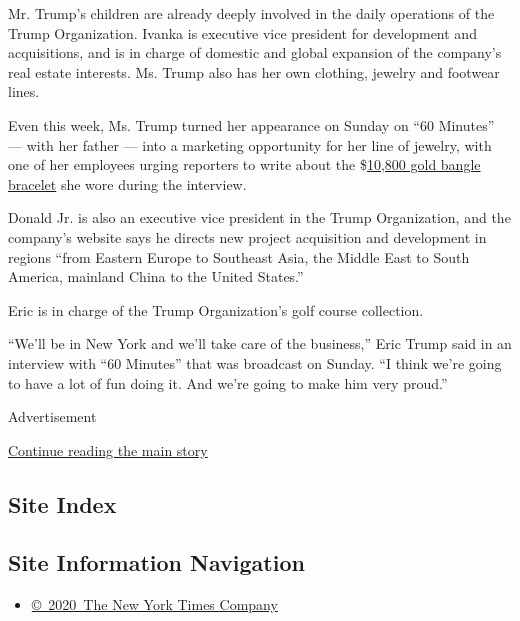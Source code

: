 Mr. Trump's children are already deeply involved in the daily operations
of the Trump Organization. Ivanka is executive vice president for
development and acquisitions, and is in charge of domestic and global
expansion of the company's real estate interests. Ms. Trump also has her
own clothing, jewelry and footwear lines.

Even this week, Ms. Trump turned her appearance on Sunday on ``60
Minutes'' --- with her father --- into a marketing opportunity for her
line of jewelry, with one of her employees urging reporters to write
about the
\$\href{http://www.ivankatrumpfinejewelry.com/metropolis/copy-of-metropolis-diamond-bangle-1}{10,800
gold bangle bracelet} she wore during the interview.

Donald Jr. is also an executive vice president in the Trump
Organization, and the company's website says he directs new project
acquisition and development in regions ``from Eastern Europe to
Southeast Asia, the Middle East to South America, mainland China to the
United States.''

Eric is in charge of the Trump Organization's golf course collection.

``We'll be in New York and we'll take care of the business,'' Eric Trump
said in an interview with ``60 Minutes'' that was broadcast on Sunday.
``I think we're going to have a lot of fun doing it. And we're going to
make him very proud.''

Advertisement

\protect\hyperlink{after-bottom}{Continue reading the main story}

\hypertarget{site-index}{%
\subsection{Site Index}\label{site-index}}

\hypertarget{site-information-navigation}{%
\subsection{Site Information
Navigation}\label{site-information-navigation}}

\begin{itemize}
\tightlist
\item
  \href{https://help.nytimes.com/hc/en-us/articles/115014792127-Copyright-notice}{©~2020~The
  New York Times Company}
\end{itemize}

